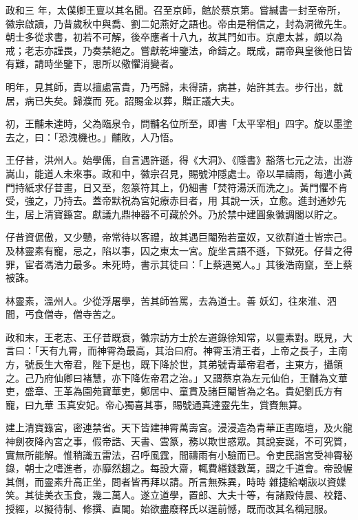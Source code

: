 \begin{pinyinscope}
 政和三
 年，太僕卿王亶以其名聞。召至京師，館於蔡京第。嘗緘書一封至帝所，徽宗啟讀，乃昔歲秋中與喬、劉二妃燕好之語也。帝由是稍信之，封為洞微先生。朝士多從求書，初若不可解，後卒應者十八九，故其門如市。京慮太甚，頗以為戒；老志亦謹畏，乃奏禁絕之。嘗獻乾坤鑒法，命鑄之。既成，謂帝與皇後他日皆有難，請時坐鑒下，思所以儆懼消變者。



 明年，見其師，責以擅處富貴，乃丐歸，未得請，病甚，始許其去。步行出，就居，病已失矣。歸濮而
 死。詔賜金以葬，贈正議大夫。



 初，王黼未達時，父為臨泉令，問黼名位所至，即書「太平宰相」四字。旋以墨塗去之，曰：「恐洩機也。」黼敗，人乃悟。



 王仔昔，洪州人。始學儒，自言遇許遜，得《大洞》、《隱書》豁落七元之法，出游嵩山，能道人未來事。政和中，徽宗召見，賜號沖隱處士。帝以旱禱雨，每遣小黃門持紙求仔昔畫，日又至，忽篆符其上，仍細書「焚符湯沃而洗之」。黃門懼不肯受，強之，乃持去。蓋帝默祝為宮妃療赤目者，用
 其說一沃，立愈。進封通妙先生，居上清寶籙宮。獻議九鼎神器不可藏於外。乃於禁中建圓象徽調閣以貯之。



 仔昔資倨傲，又少戇，帝常待以客禮，故其遇巨閹殆若童奴，又欲群道士皆宗己。及林靈素有寵，忌之，陷以事，囚之東太一宮。旋坐言語不遜，下獄死。仔昔之得罪，宦者馮浩力最多。未死時，書示其徒曰：「上蔡遇冤人。」其後浩南竄，至上蔡被誅。



 林靈素，溫州人。少從浮屠學，苦其師笞罵，去為道士。善
 妖幻，往來淮、泗間，丐食僧寺，僧寺苦之。



 政和末，王老志、王仔昔既衰，徽宗訪方士於左道錄徐知常，以靈素對。既見，大言曰：「天有九霄，而神霄為最高，其治曰府。神霄玉清王者，上帝之長子，主南方，號長生大帝君，陛下是也，既下降於世，其弟號青華帝君者，主東方，攝領之。己乃府仙卿曰褚慧，亦下降佐帝君之治。」又謂蔡京為左元仙伯，王黼為文華吏，盛章、王革為園苑寶華吏，鄭居中、童貫及諸巨閹皆為之名。貴妃劉氏方有寵，曰九華
 玉真安妃。帝心獨喜其事，賜號通真達靈先生，賞賚無算。



 建上清寶籙宮，密連禁省。天下皆建神霄萬壽宮。浸浸造為青華正晝臨壇，及火龍神劍夜降內宮之事，假帝誥、天書、雲篆，務以欺世惑眾。其說妄誕，不可究質，實無所能解。惟稍識五雷法，召呼風霆，間禱雨有小驗而已。令吏民詣宮受神霄秘錄，朝士之嗜進者，亦靡然趨之。每設大齋，輒費緡錢數萬，謂之千道會。帝設幄其側，而靈素升高正坐，問者皆再拜以請。所言無殊異，時時
 雜捷給嘲詼以資媟笑。其徒美衣玉食，幾二萬人。遂立道學，置郎、大夫十等，有諸殿侍晨、校籍、授經，以擬待制、修撰、直閣。始欲盡廢釋氏以逞前憾，既而改其名稱冠服。




\end{pinyinscope}
